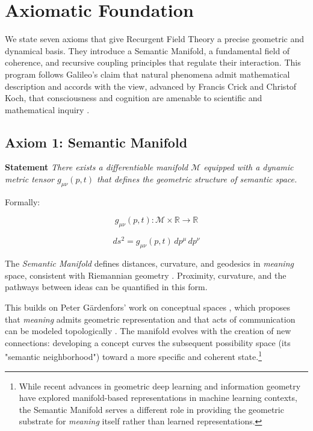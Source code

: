 \chapter{Axiomatic Foundation}
\label{1:axiomatic_foundation}

We state seven axioms that give Recurgent Field Theory a precise geometric and dynamical basis. They introduce a Semantic Manifold, a fundamental field of coherence, and recursive coupling principles that regulate their interaction. This program follows Galileo's claim that natural phenomena admit mathematical description \autocite{Galilei1623} and accords with the view, advanced by Francis Crick and Christof Koch, that consciousness and cognition are amenable to scientific and mathematical inquiry \autocite{Crick1990, KochConsciousness2019}.


\section{Axiom 1: Semantic Manifold}
\label{1.1:axiom_1_semantic_manifold}

\textbf{Statement} \textit{There exists a differentiable manifold \(\mathcal{M}\) equipped with a dynamic metric tensor \(g_{\mu\nu}(p,t)\) that defines the geometric structure of semantic space.}

Formally:

\begin{equation}
g_{\mu\nu}(p,t) : \mathcal{M} \times \mathbb{R} \rightarrow \mathbb{R}
\end{equation}

\begin{equation}
ds^2 = g_{\mu\nu}(p,t) \, dp^\mu \, dp^\nu
\end{equation}

The \textit{Semantic Manifold} defines distances, curvature, and geodesics in \textit{meaning} space, consistent with Riemannian geometry \autocite{Riemann1868}. Proximity, curvature, and the pathways between ideas can be quantified in this form.

This builds on Peter Gärdenfors' work on conceptual spaces \autocite{Gardenfors2000}, which proposes that \textit{meaning} admits geometric representation and that acts of communication can be modeled topologically \autocite{Gardenfors2014}. The manifold evolves with the creation of new connections: developing a concept curves the subsequent possibility space (its "semantic neighborhood") toward a more specific and coherent state.\footnote{While recent advances in geometric deep learning \autocite{Bronstein2021} and information geometry \autocite{Amari2016} have explored manifold-based representations in machine learning contexts, the Semantic Manifold serves a different role in providing the geometric substrate for \textit{meaning} itself rather than learned representations.}

